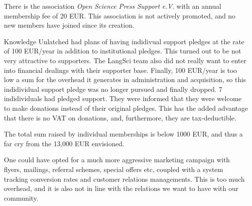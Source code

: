 \documentclass[nonflat,smallfont
]{langsci/langscibook}
\newcommand{\evaluation}[1]{
  \renewcommand{\tblslinecolour}{lsLightOrange}
  \tblssy{receipt}{Evaluation}{\vspace*{-5mm}#1}
}
\newcommand{\othersolutions}[1]{
  \renewcommand{\tblslinecolour}{lsDarkGreenOne}
  \tblssy{more}{Other solutions}{\vspace*{-5mm}#1}
}
\renewcommand{\tblssy}[4][black!12]{%
  \renewcommand{\langscisymbol}{#2}\renewcommand{\tblsboxcolor}{#1}
  \begin{mdframed}[style=yellowexercise,frametitle={#3}]
    #4
  \end{mdframed}
}
\begin{document}
\evaluation{
There is the association \textit{Open Science Press Support e.V}. with an annual membership fee of 20 EUR. This association is not actively promoted, and no new members have joined since its creation. 

Knowledge Unlatched had plans of having indidivual support pledges at the rate of 100 EUR/year in addition to institutional pledges. This turned out to be not very attractive to supporters. The LangSci team also did not really want to enter into financial dealings with their supporter base. Finally, 100 EUR/year is too low a sum for the overhead it generates in administration and acquisition, so this indidividual support pledge was no longer pursued and finally dropped. 7 indidividuals had pledged support. They were informed that they were welcome to make donations instead of their original pledges. This has the added advantage that there is no VAT on donations, and, furthermore, they are tax-deductible. 

The total sum raised by individual memberships is below 1000 EUR, and thus a far cry from the 13,000 EUR envisioned. 

}
\othersolutions{
One could have opted for a much more aggressive marketing campaign with flyers, mailings, referral schemes, special offers etc, coupled with a system tracking conversion rates and customer relations managements. This is too much overhead, and it is also not in line with the relations we want to have with our community. 
}

\newpage 
\end{document}
